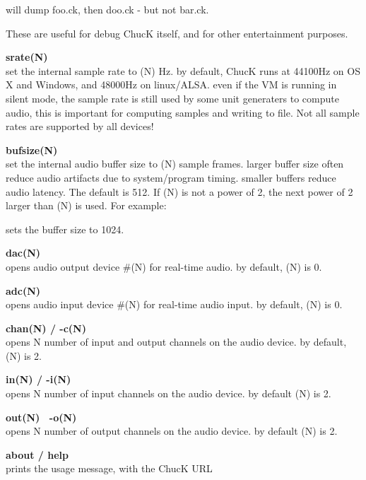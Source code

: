 will dump foo.ck, then doo.ck - but not bar.ck. 

These are useful for debug ChucK itself, and for other entertainment purposes. 

{\bf \doubledash srate(N)}\\
set the internal sample rate to (N) Hz. by default,  ChucK runs at 44100Hz on OS X and Windows, and 48000Hz on linux/ALSA. even if the VM is running in \doubledash silent mode, the sample rate is still used by some unit generaters to compute audio, this is important for computing samples and writing to file. Not all sample rates are supported by all devices! 

{\bf \doubledash bufsize(N)}\\
set the internal audio buffer size to (N) sample frames. larger buffer size often reduce audio artifacts due to system/program timing. smaller buffers reduce audio latency. The default is 512. If (N) is not a power of 2, the next power of 2 larger than (N) is used. For example: 


sets the buffer size to 1024. 

{\bf \doubledash dac(N)}\\
opens audio output device \#(N) for real-time audio. by default,  (N) is 0. 

{\bf \doubledash adc(N)}\\
opens audio input device \#(N) for real-time audio input. by default, (N) is 0. 

{\bf \doubledash chan(N) / -c(N)}\\
opens N number of input and output channels on the audio device. by default, (N) is 2.

{\bf \doubledash in(N) / -i(N)}\\
opens N number of input channels on the audio device. by default (N) is 2.

{\bf \doubledash out(N) \ -o(N)}\\
opens N number of output channels on the audio device. by default (N) is 2.

{\bf \doubledash about / \doubledash help}\\
prints the usage message, with the ChucK URL
